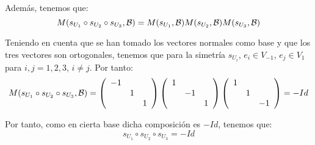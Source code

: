 \begin{ejercicio}
\begin{description}
        Además, tenemos que:
        \begin{equation*}
            M(s_{U_1}\circ s_{U_2} \circ s_{U_3}, \mathcal{B})
            = M(s_{U_1}, \mathcal{B})
            M(s_{U_2}, \mathcal{B})
            M(s_{U_3}, \mathcal{B})
        \end{equation*}

        Teniendo en cuenta que se han tomado los vectores normales como base y que los tres vectores son ortogonales, tenemos que para la simetría $s_{U_i}$, $e_i\in V_{-1}$, $e_j\in V_{1}$ para $i,j=1,2,3$, $i\neq j$. Por tanto:
        \begin{equation*}
            M(s_{U_1}\circ s_{U_2} \circ s_{U_3}, \mathcal{B})=
            \left(\begin{array}{ccc}
                -1 &  \\
                 & 1 \\
                 && 1
            \end{array}\right)
            \left(\begin{array}{ccc}
                1 &  \\
                 & -1 \\
                 && 1
            \end{array}\right)
            \left(\begin{array}{ccc}
                1 &  \\
                 & 1 \\
                 && -1
            \end{array}\right) = -Id
        \end{equation*}

        Por tanto, como en cierta base dicha composición es $-Id$, tenemos que:
        \begin{equation*}
            s_{U_1}\circ s_{U_2} \circ s_{U_3}=-Id
        \end{equation*}
    \end{description}
\end{ejercicio}


